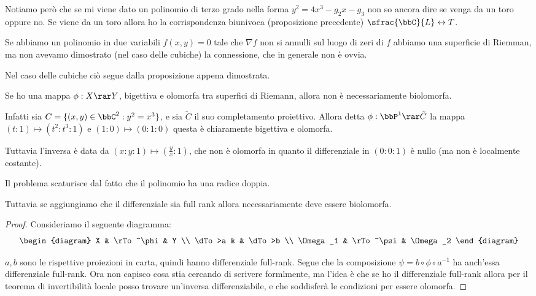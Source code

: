 \begin{osservazione}
  Notiamo però che se mi viene dato un polinomio di terzo grado nella
  forma $y^2 = 4x^3 - g_2 x - g_3$ non so ancora dire se venga da un
  toro oppure no. Se viene da un toro allora ho la corrispondenza
  biunivoca (proposizione precedente) $\sfrac{\bbC}{L} \leftrightarrow T$.
\end{osservazione}

\begin{osservazione}
  Se abbiamo un polinomio in due variabili $f(x, y) = 0$ tale che
  $\nabla f$ non si annulli sul luogo di zeri di $f$ abbiamo una
  superficie di Riemman, ma non avevamo dimostrato (nel caso delle
  cubiche) la connessione, che in generale non è ovvia.

  Nel caso delle cubiche ciò segue dalla proposizione appena dimostrata.
\end{osservazione}


  Se ho una mappa $\phi: X \rar Y$, bigettiva e olomorfa tra superfici di Riemann, allora non è necessariamente biolomorfa.

  Infatti sia $C = \{ (x,y) \in \bbC^2 : y^2=x^3 \}$, e sia $\tilde C$ il suo completamento proiettivo. Allora detta $\phi: \bbP^1 \rar \tilde C$ la mappa $ (t : 1) \mapsto (t^2 : t^3 : 1)$ e $(1 : 0) \mapsto (0:1:0)$ questa è chiaramente bigettiva e olomorfa.

  Tuttavia l'inversa è data da $(x:y:1) \mapsto (\frac yx:1)$, che non è olomorfa in quanto il differenziale in $(0:0:1)$ è nullo (ma non è localmente costante).

  Il problema scaturisce dal fatto che il polinomio ha una radice doppia.

  Tuttavia se aggiungiamo che il differenziale sia full rank allora necessariamente deve essere biolomorfa.
  \begin{proof}
      Consideriamo il seguente diagramma:
      \[
      \begin{diagram}
          X & \rTo^\phi & Y \\
          \dTo>a & & \dTo>b \\
          \Omega_1 & \rTo^\psi & \Omega_2
      \end{diagram}
      \]

      $a, b$ sono le rispettive proiezioni in carta, quindi hanno differenziale full-rank. Segue che la composizione $\psi = b\circ \phi \circ a^{-1}$ ha anch'essa differenziale full-rank.
      Ora non capisco cosa stia cercando di scrivere formlmente, ma l'idea è che se ho il differenziale full-rank allora per il teorema di invertibilità locale posso trovare un'inversa differenziabile, e che soddisferà le condizioni per essere olomorfa. %
  \end{proof}

